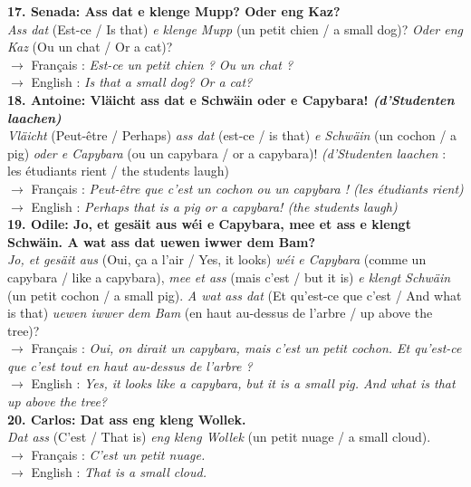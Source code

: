\noindent\textbf{17. Senada: Ass dat e klenge Mupp? Oder eng Kaz?}\\
\textit{Ass dat} (Est-ce / Is that) \textit{e klenge Mupp} (un petit chien / a small dog)? \textit{Oder eng Kaz} (Ou un chat / Or a cat)?\\
$\rightarrow$ Français : \textit{Est-ce un petit chien ? Ou un chat ?}\\
$\rightarrow$ English : \textit{Is that a small dog? Or a cat?}\\[0.5em]

\noindent\textbf{18. Antoine: Vläicht ass dat e Schwäin oder e Capybara! \textit{(d'Studenten laachen)}}\\
\textit{Vläicht} (Peut-être / Perhaps) \textit{ass dat} (est-ce / is that) \textit{e Schwäin} (un cochon / a pig) \textit{oder e Capybara} (ou un capybara / or a capybara)! \textit{(d'Studenten laachen} : les étudiants rient / the students laugh)\\
$\rightarrow$ Français : \textit{Peut-être que c'est un cochon ou un capybara ! (les étudiants rient)}\\
$\rightarrow$ English : \textit{Perhaps that is a pig or a capybara! (the students laugh)}\\[0.5em]

\noindent\textbf{19. Odile: Jo, et gesäit aus wéi e Capybara, mee et ass e klengt Schwäin. A wat ass dat uewen iwwer dem Bam?}\\
\textit{Jo, et gesäit aus} (Oui, ça a l'air / Yes, it looks) \textit{wéi e Capybara} (comme un capybara / like a capybara), \textit{mee et ass} (mais c'est / but it is) \textit{e klengt Schwäin} (un petit cochon / a small pig). \textit{A wat ass dat} (Et qu'est-ce que c'est / And what is that) \textit{uewen iwwer dem Bam} (en haut au-dessus de l'arbre / up above the tree)?\\
$\rightarrow$ Français : \textit{Oui, on dirait un capybara, mais c'est un petit cochon. Et qu'est-ce que c'est tout en haut au-dessus de l'arbre ?}\\
$\rightarrow$ English : \textit{Yes, it looks like a capybara, but it is a small pig. And what is that up above the tree?}\\[0.5em]

\noindent\textbf{20. Carlos: Dat ass eng kleng Wollek.}\\
\textit{Dat ass} (C'est / That is) \textit{eng kleng Wollek} (un petit nuage / a small cloud).\\
$\rightarrow$ Français : \textit{C'est un petit nuage.}\\
$\rightarrow$ English : \textit{That is a small cloud.}\\[0.5em]

